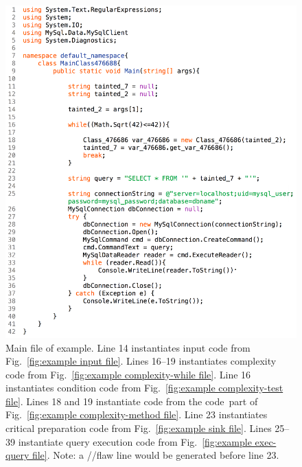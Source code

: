 \documentclass[12pt]{article}
\begin{document}
\begin{figure}[htbp]
  \includegraphics[width=\linewidth]{fig_example_code1.png}
  \caption{Main file of example. Line 14 instantiates input code from 
    Fig.~\ref{fig:example input file}. Lines 16--19 instantiates complexity code from 
    Fig.~\ref{fig:example complexity-while file}. Line 16 instantiates condition code from
    Fig.~\ref{fig:example complexity-test file}.  Lines 18 and 19 instantiate code from the
    \texlangle code\texrangle\ part of Fig.~\ref{fig:example complexity-method file}.
    Line 23 instantiates critical preparation code from Fig.~\ref{fig:example sink file}.
    Lines 25--39 instantiate query execution code from Fig.~\ref{fig:example exec-query file}.
    Note: a //flaw line would be generated before line 23.
  }
  \label{fig:example main file}
\end{figure}
\end{document}
